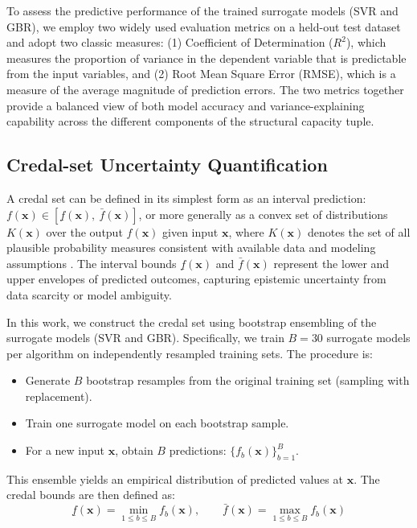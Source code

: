 \documentclass[authoryear,preprint,review,12pt]{elsarticle}
\begin{document}
To assess the predictive performance of the trained surrogate models (SVR and GBR), we employ two widely used evaluation metrics on a held-out test dataset and adopt two classic measures: (1) {Coefficient of Determination ($R^2$)}, which measures the proportion of variance in the dependent variable that is predictable from the input variables, and (2) {Root Mean Square Error (RMSE)}, which is a measure of the average magnitude of prediction errors. The two metrics together provide a balanced view of both model accuracy and variance-explaining capability across the different components of the structural capacity tuple.

\subsection{Credal-set Uncertainty Quantification}

A credal set can be defined in its simplest form as an interval prediction:$
f(\bm{x}) \in \left[ \underline{f}(\bm{x}),\ \bar{f}(\bm{x}) \right]$,
or more generally as a convex set of distributions \( K(\bm{x}) \) over the output \( f(\bm{x}) \) given input \( \bm{x} \), where \( K(\bm{x}) \) denotes the set of all plausible probability measures consistent with available data and modeling assumptions \citep{Walley1991}. The interval bounds \( \underline{f}(\bm{x}) \) and \( \bar{f}(\bm{x}) \) represent the lower and upper envelopes of predicted outcomes, capturing epistemic uncertainty from data scarcity or model ambiguity.

In this work, we construct the credal set using bootstrap ensembling of the surrogate models (SVR and GBR). Specifically, we train \( B = 30 \) surrogate models per algorithm on independently resampled training sets. The procedure is:

\begin{itemize}
    \item Generate \( B \) bootstrap resamples from the original training set (sampling with replacement).
    \item Train one surrogate model on each bootstrap sample.
    \item For a new input \( \bm{x} \), obtain \( B \) predictions: \( \{ f_b(\bm{x}) \}_{b=1}^B \).
\end{itemize}

This ensemble yields an empirical distribution of predicted values at \( \bm{x} \). The credal bounds are then defined as:
\begin{equation}
\underline{f}(\bm{x}) = \min_{1 \le b \le B} f_b(\bm{x}), \qquad
\bar{f}(\bm{x}) = \max_{1 \le b \le B} f_b(\bm{x})
\label{eq:credal_bounds}
\end{equation}
\end{document}
